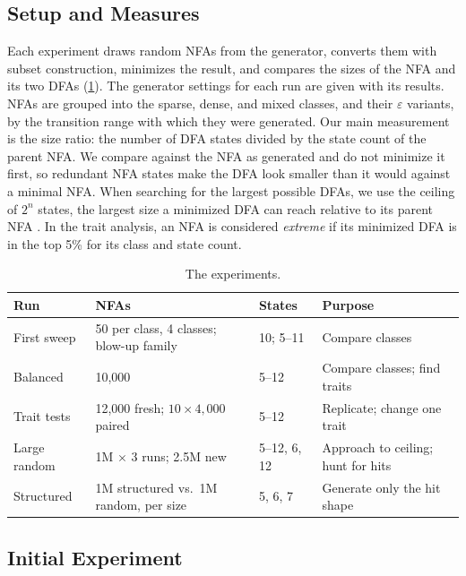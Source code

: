 \documentclass[9pt]{ieeeconf}
\begin{document}
\subsection{Setup and Measures}
\label{sec:setup}

Each experiment draws random NFAs from the generator, converts them with subset construction, minimizes the result, and compares the sizes of the NFA and its two DFAs (\cref{tab:runs}). The generator settings for each run are given with its results. NFAs are grouped into the sparse, dense, and mixed classes, and their $\varepsilon$ variants, by the transition range with which they were generated. Our main measurement is the size ratio: the number of DFA states divided by the state count of the parent NFA. We compare against the NFA as generated and do not minimize it first, so redundant NFA states make the DFA look smaller than it would against a minimal NFA. When searching for the largest possible DFAs, we use the ceiling of $2^n$ states, the largest size a minimized DFA can reach relative to its parent NFA \cite{sipser2006introduction}. In the trait analysis, an NFA is considered \emph{extreme} if its minimized DFA is in the top 5\% for its class and state count.

\begin{table}[t]
  \centering
  \caption{The experiments.}
  \label{tab:runs}
  \small
  \begin{tabular}{@{}lp{2.0cm}lp{2.3cm}@{}}
    \toprule
    Run & NFAs & States & Purpose \\
    \midrule
    First sweep & 50 per class, 4 classes; blow-up family & 10; 5--11 & Compare classes \\
    Balanced & 10,000 & 5--12 & Compare classes; find traits \\
    Trait tests & 12,000 fresh; $10\times4{,}000$ paired & 5--12 & Replicate; change one trait \\
    Large random & 1M $\times$ 3 runs; 2.5M new & 5--12, 6, 12 & Approach to ceiling; hunt for hits \\
    Structured & 1M structured vs.\ 1M random, per size & 5, 6, 7 & Generate only the hit shape \\
    \bottomrule
  \end{tabular}
\end{table}

\subsection{Initial Experiment}
\label{sec:first}
\end{document}
